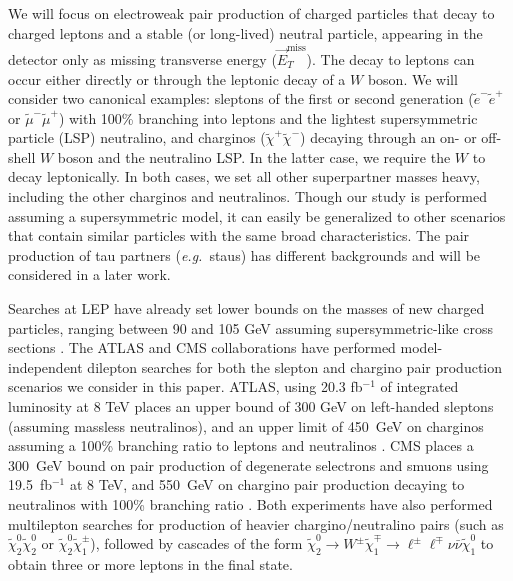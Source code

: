 We will focus on electroweak pair production of charged particles that decay to charged leptons and a stable (or long-lived) neutral particle, appearing in the detector only as missing transverse energy ($\vec{E}^\text{miss}_T$). The decay to leptons can occur either directly or through the leptonic decay of a $W$ boson. We will consider two canonical examples: sleptons of the first or second generation ($\tilde{e}^-\tilde{e}^+$ or $\tilde{\mu}^-\tilde{\mu}^+$) with 100\% branching into leptons and the lightest supersymmetric particle (LSP) neutralino, and charginos ($\tilde{\chi}^+\tilde{\chi}^-$) decaying through an on- or off-shell $W$ boson and the neutralino LSP. In the latter case, we require the $W$ to decay leptonically. In both cases, we set all other superpartner masses heavy, including the other charginos and neutralinos. Though our study is performed assuming a supersymmetric model, it can easily be generalized to other scenarios that contain similar particles with the same broad characteristics. The pair production of tau partners ({\it e.g.}~staus) has different backgrounds and will be considered in a later work.

Searches at LEP have already set lower bounds on the masses of new charged particles, ranging between 90 and 105 GeV assuming supersymmetric-like cross sections \cite{Beringer:1900zz}. The ATLAS and CMS collaborations have performed model-independent dilepton searches for both the slepton and chargino pair production scenarios we consider in this paper. ATLAS, using 20.3 fb$^{-1}$ of integrated luminosity at 8 TeV places an upper bound of 300 GeV on left-handed sleptons (assuming massless neutralinos), and an upper limit of 450~GeV on charginos assuming a 100\% branching ratio to leptons and neutralinos \cite{:2012gg,ATLAS-CONF-2013-049}. CMS places a 300~GeV bound on pair production of degenerate selectrons and smuons using 19.5~fb$^{-1}$ at 8 TeV, and 550~GeV on chargino pair production decaying to neutralinos with 100\% branching ratio \cite{CMS-PAS-SUS-12-022,CMS-PAS-SUS-13-006}. Both experiments \cite{CMS-PAS-SUS-12-022,CMS-PAS-SUS-13-006,Aad:2012ku,Aad:2012hba,ATLAS-CONF-2013-036,ATLAS-CONF-2013-035} have also performed multilepton searches for production of heavier chargino/neutralino pairs (such as $\tilde{\chi}^0_2 \tilde{\chi}^0_2$ or $\tilde{\chi}^0_2 \tilde{\chi}^\pm_1$), followed by cascades of the form $\tilde{\chi}^0_2 \to W^\pm \tilde{\chi}^\mp_1 \to \ell^\pm \ell^\mp \nu \bar{\nu} \tilde{\chi}^0_1$ to obtain three or more leptons in the final state.

